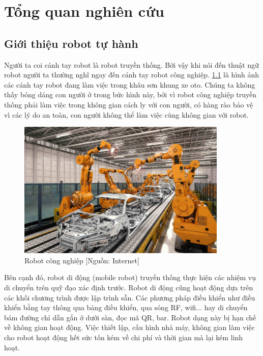\chapter{Tổng quan nghiên cứu}
\label{chap:1tqnc}

\section{Giới thiệu robot tự hành}


%

Người ta coi cánh tay robot là robot truyền thống.
Bởi vậy khi nói đến thuật ngữ robot người ta thường nghĩ ngay đến cánh tay robot công nghiệp. \figurename{\ref{fig:RBCongNghiep}} là hình ảnh các cánh tay robot đang làm việc trong khâu sơn khung xe oto. Chúng ta không thấy bóng dáng con người ở trong bức hình này, bởi vì robot công nghiệp truyền thống phải làm việc trong không gian cách ly với con người, có hàng rào bảo vệ vì các lý do an toàn, con người không thể làm việc cùng không gian với robot.

\begin{figure}[hpt]
  \centering
  \includegraphics[width=10cm]{figures/IndustrialRobot.jpg}
  \caption{Robot công nghiệp [Nguồn: Internet]}
  \label{fig:RBCongNghiep}
\end{figure}

Bên cạnh đó, robot di động (mobile robot) truyền thống thực hiện các nhiệm vụ di chuyển trên quỹ đạo xác định trước. Robot di động cũng hoạt động dựa trên các khối chương trình được lập trình sẵn. Các phương pháp điều khiển như điều khiển bằng tay thông qua bảng điều khiển, qua sóng RF, wifi... hay di chuyển bám đường chỉ dẫn gắn ở dưới sàn, đọc mã QR, bar. Robot dạng này bị hạn chế về không gian hoạt động. Việc thiết lập, cấu hình nhà máy, không gian làm việc cho robot hoạt động hết sức tốn kém về chi phí và thời gian mà lại kém linh hoạt.

